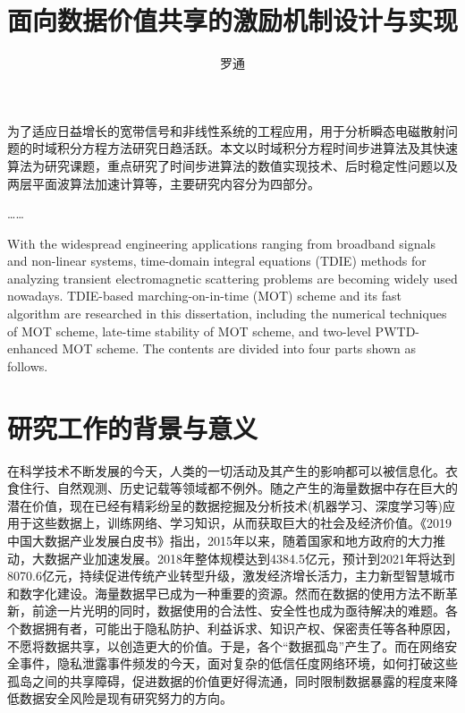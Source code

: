 \documentclass[promaster]{thesis-uestc}
\title{面向数据价值共享的激励机制设计与实现}{An Incentive Mechanism for Data Sharing}
\author{罗通}{Luo Tong}
\begin{document}
\makecover

\begin{chineseabstract}
为了适应日益增长的宽带信号和非线性系统的工程应用，用于分析瞬态电磁散射问题的时域积分方程方法研究日趋活跃。本文以时域积分方程时间步进算法及其快速算法为研究课题，重点研究了时间步进算法的数值实现技术、后时稳定性问题以及两层平面波算法加速计算等，主要研究内容分为四部分。

……

\end{chineseabstract}

\begin{englishabstract}
With the widespread engineering applications ranging from broadband signals and non-linear systems, time-domain integral equations (TDIE) methods for analyzing transient electromagnetic scattering problems are becoming widely used nowadays. TDIE-based marching-on-in-time (MOT) scheme and its fast algorithm are researched in this dissertation, including the numerical techniques of MOT scheme, late-time stability of MOT scheme, and two-level PWTD-enhanced MOT scheme. The contents are divided into four parts shown as follows.

\end{englishabstract}

\thesistableofcontents

\thesischapterexordium

\section{研究工作的背景与意义}

在科学技术不断发展的今天，人类的一切活动及其产生的影响都可以被信息化。衣食住行、自然观测、历史记载等领域都不例外。随之产生的海量数据中存在巨大的潜在价值，现在已经有精彩纷呈的数据挖掘及分析技术(机器学习、深度学习等)应用于这些数据上，训练网络、学习知识，从而获取巨大的社会及经济价值。《2019中国大数据产业发展白皮书》\cite{2019baipishu}指出，2015年以来，随着国家和地方政府的大力推动，大数据产业加速发展。2018年整体规模达到4384.5亿元，预计到2021年将达到8070.6亿元，持续促进传统产业转型升级，激发经济增长活力，主力新型智慧城市和数字化建设。海量数据早已成为一种重要的资源。然而在数据的使用方法不断革新，前途一片光明的同时，数据使用的合法性、安全性也成为亟待解决的难题。各个数据拥有者，可能出于隐私防护、利益诉求、知识产权、保密责任等各种原因，不愿将数据共享，以创造更大的价值。于是，各个“数据孤岛”产生了。而在网络安全事件，隐私泄露事件频发的今天，面对复杂的低信任度网络环境，如何打破这些孤岛之间的共享障碍，促进数据的价值更好得流通，同时限制数据暴露的程度来降低数据安全风险是现有研究努力的方向。
\end{document}
